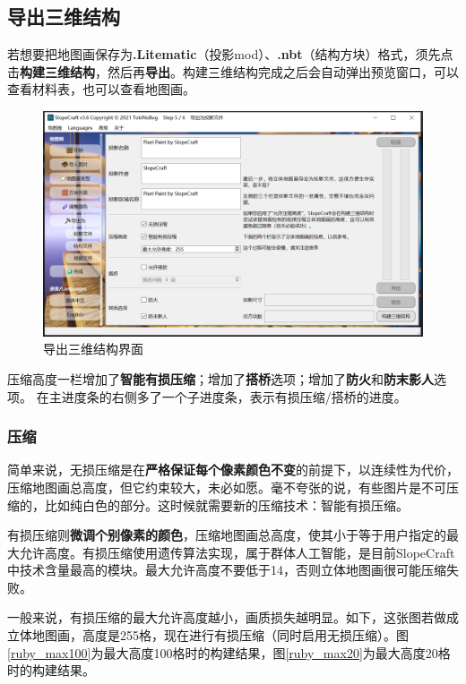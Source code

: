 \documentclass[UTF8]{ctexart}
\begin{document}
    \subsection{导出三维结构}
    若想要把地图画保存为\textbf{.Litematic}（投影mod）、\textbf{.nbt}（结构方块）格式，须先点击\textbf{构建三维结构}，然后再\textbf{导出}。构建三维结构完成之后会自动弹出预览窗口，可以查看材料表，也可以查看地图画。

    \begin{figure}[htbp]
        \centering
        \includegraphics[width=15cm]{Img2_Export3D.png}
        \caption{导出三维结构界面}
    \end{figure}

    压缩高度一栏增加了\textbf{智能有损压缩}；增加了\textbf{搭桥}选项；增加了\textbf{防火}和\textbf{防末影人}选项。 在主进度条的右侧多了一个子进度条，表示有损压缩/搭桥的进度。
        
    \subsubsection{压缩}
    简单来说，无损压缩是在\textbf{严格保证每个像素颜色不变}的前提下，以连续性为代价，压缩地图画总高度，但它约束较大，未必如愿。毫不夸张的说，有些图片是不可压缩的，比如纯白色的部分。这时候就需要新的压缩技术：智能有损压缩。

    有损压缩则\textbf{微调个别像素的颜色}，压缩地图画总高度，使其小于等于用户指定的最大允许高度。有损压缩使用遗传算法实现，属于群体人工智能，是目前SlopeCraft中技术含量最高的模块。最大允许高度不要低于14，否则立体地图画很可能压缩失败。

    一般来说，有损压缩的最大允许高度越小，画质损失越明显。如下，这张图若做成立体地图画，高度是255格，现在进行有损压缩（同时启用无损压缩）。图\ref*{ruby_max100}为最大高度100格时的构建结果，图\ref*{ruby_max20}为最大高度20格时的构建结果。
\end{document}
